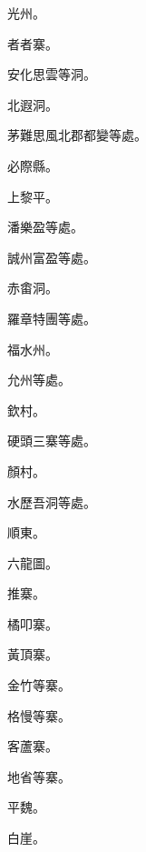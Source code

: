 \begin{pinyinscope}
 光州。



 者者寨。



 安化思雲等洞。



 北遐洞。



 茅難思風北郡都變等處。



 必際縣。



 上黎平。



 潘樂盈等處。



 誠州富盈等處。



 赤畬洞。



 羅章特團等處。



 福水州。



 允州等處。



 欽村。



 硬頭三寨等處。



 顏村。



 水歷吾洞等處。



 順東。



 六龍圖。



 推寨。



 橘叩寨。



 黃頂寨。



 金竹等寨。



 格慢等寨。



 客蘆寨。



 地省等寨。



 平魏。



 白崖。




\end{pinyinscope}
